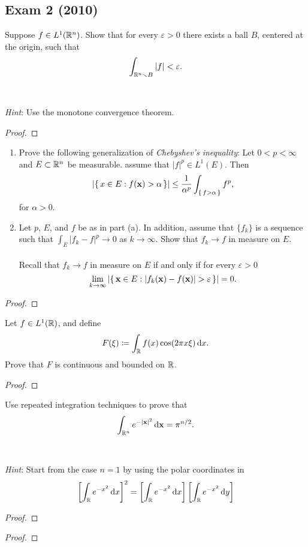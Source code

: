 \subsection{Exam 2 (2010)}
\begin{problem}
Suppose $f\in L^1(\mathbb{R}^n)$. Show that for every $\varepsilon>0$ there
exists a ball $B$, centered at the origin, such that
\[
\int_{\mathbb{R}^n\smallsetminus B}|f|<\varepsilon.
\]
\\\\
\emph{Hint}: Use the monotone convergence theorem.
\end{problem}
\begin{proof}
\end{proof}
\begin{problem}
\begin{enumerate}[label=(\alph*),noitemsep]
\item Prove the following generalization of \emph{Chebyshev's inequality}:
  Let $0<p<\infty$ and $E\subset\mathbb{R}^n$ be measurable. assume that
  $|f|^p\in L^1(E)$. Then
\[
\left|\left\{\,x\in E:f(\mathbf{x})>\alpha\,\right\}\right|
\leq\frac{1}{\alpha^p}\int_{\left\{\,f>\alpha\,\right\}}f^p,
\]
for $\alpha>0$.
\item Let $p$, $E$, and $f$ be as in part (a). In addition, assume that
  $\{f_k\}$ is a sequence such that $\int_E|f_k-f|^p\to 0$ as
  $k\to\infty$. Show that $f_k\to f$ in measure on $E$.
\\\\
Recall that $f_k\to f$ in measure on $E$ if and only if for every
$\varepsilon>0$
\[
\lim_{k\to\infty}\left|\left\{\,\bfx\in
    E:|f_k(\bfx)-f(\bfx)|>\varepsilon\,\right\}\right|=0.
\]
\end{enumerate}
\end{problem}
\begin{proof}
\end{proof}

\begin{problem}
Let $f\in L^1(\mathbb{R})$, and define
\[
F(\xi)\coloneqq\int_{\mathbb{R}} f(x)\cos(2\pi x\xi)\mathop{}\!\mathrm{d} x.
\]
Prove that $F$ is continuous and bounded on $\mathbb{R}$.
\end{problem}
\begin{proof}
\end{proof}

\begin{problem}
Use repeated integration techniques to prove that
\[
\int_{\mathbb{R}^n} e^{-|\mathbf{x}|^2}\mathop{}\!\mathrm{d}\mathbf{x}=\pi^{n/2}.
\]
\\\\
\emph{Hint}: Start from the case $n=1$ by using the polar coordinates in
\[
\left[\int_{\mathbb{R}} e^{-x^2}\mathop{}\!\mathrm{d} x\right]^2=
\left[\int_{\mathbb{R}} e^{-x^2}\mathop{}\!\mathrm{d} x\right]
\left[\int_{\mathbb{R}} e^{-x^2}\mathop{}\!\mathrm{d} y\right]
\]
\end{problem}
\begin{proof}
\end{proof}

\begin{problem}
\end{problem}
\begin{proof}
\end{proof}

